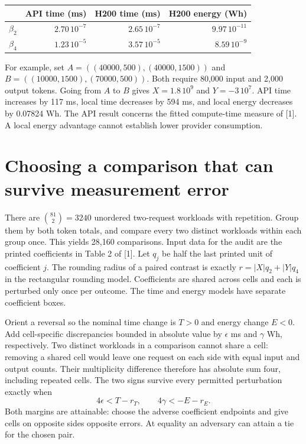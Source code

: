 \documentclass[11pt]{article}
\begin{document}
\begin{center}\small
\begin{tabular}{lrrr}\toprule & API time (ms)& H200 time (ms)& H200 energy (Wh)\\\midrule
$\beta_2$&$2.70\,10^{-7}$&$2.65\,10^{-7}$&$9.97\,10^{-11}$\\
$\beta_4$&$1.23\,10^{-5}$&$3.57\,10^{-5}$&$8.59\,10^{-9}$\\\bottomrule\end{tabular}
\end{center}
For example, set $A=((40000,500),(40000,1500))$ and $B=((10000,1500),(70000,500))$. Both require 80,000 input and 2,000 output tokens. Going from $A$ to $B$ gives $X=1.8\,10^9$ and $Y=-3\,10^7$. API time increases by 117 ms, local time decreases by 594 ms, and local energy decreases by 0.07824 Wh. The API result concerns the fitted compute-time measure of [1]. A local energy advantage cannot establish lower provider consumption.
\newpage

\section*{Choosing a comparison that can survive measurement error}
There are $\binom{81}{2}=3240$ unordered two-request workloads with repetition. Group them by both token totals, and compare every two distinct workloads within each group once. This yields 28,160 comparisons. Input data for the audit are the printed coefficients in Table 2 of [1]. Let $q_j$ be half the last printed unit of coefficient $j$. The rounding radius of a paired contrast is exactly $r=|X|q_2+|Y|q_4$ in the rectangular rounding model. Coefficients are shared across cells and each is perturbed only once per outcome. The time and energy models have separate coefficient boxes.

Orient a reversal so the nominal time change is $T>0$ and energy change $E<0$. Add cell-specific discrepancies bounded in absolute value by $\epsilon$ ms and $\gamma$ Wh, respectively. Two distinct workloads in a comparison cannot share a cell: removing a shared cell would leave one request on each side with equal input and output counts. Their multiplicity difference therefore has absolute sum four, including repeated cells. The two signs survive every permitted perturbation exactly when
\[
4\epsilon<T-r_T,\qquad 4\gamma<-E-r_E.
\]
Both margins are attainable: choose the adverse coefficient endpoints and give cells on opposite sides opposite errors. At equality an adversary can attain a tie for the chosen pair.
\end{document}

